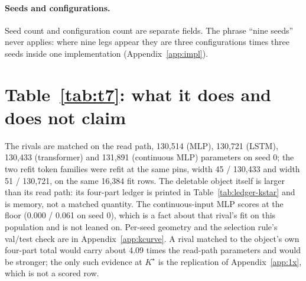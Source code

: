 \documentclass{article} %
\newcommand{\Kstar}{\ensuremath{K^{\star}}}
\begin{document}
\paragraph{Seeds and configurations.} Seed count and configuration count are separate fields. The
phrase ``nine seeds'' never applies: where nine legs appear they are three configurations times
three seeds inside one implementation (Appendix~\ref{app:impl}).

\section{Table~\ref{tab:t7}: what it does and does not claim}
\label{app:t7more}
The rivals are matched on the read path,
130,514 (MLP), 130,721 (LSTM), 130,433 (transformer) and 131,891 (continuous MLP) parameters
on seed 0; the two refit token families were refit at the same pins, width 45 / 130,433 and
width 51 / 130,721, on the same 16,384 fit rows. %
The deletable object itself is larger than its read path: its four-part ledger is printed in
Table~\ref{tab:ledger-kstar} and is memory, not a matched quantity. The continuous-input MLP
scores at the floor (0.000 / 0.061 on seed 0), which is a fact about that rival's fit on this
population and is not leaned on. %
Per-seed geometry and the selection rule's val/test check are in Appendix~\ref{app:kcurve}.
A rival matched to the object's own four-part total would carry about 4.09 times the
read-path parameters and would be stronger; the only such evidence at $\Kstar$ is the
replication of Appendix~\ref{app:1x}, which is not a scored row. %
\end{document}
